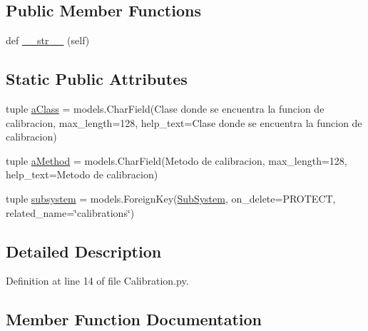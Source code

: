 \subsection*{Public Member Functions}
\begin{DoxyCompactItemize}
\item 
def \hyperlink{class_ground_segment_1_1models_1_1_calibration_1_1_calibration_a2f3b6dc4e9e5e2987a6b9c27184d9d6c}{\+\_\+\+\_\+str\+\_\+\+\_\+} (self)
\end{DoxyCompactItemize}
\subsection*{Static Public Attributes}
\begin{DoxyCompactItemize}
\item 
tuple \hyperlink{class_ground_segment_1_1models_1_1_calibration_1_1_calibration_aeb33dd930555ce324688e2cd8979a7b5}{a\+Class} = models.\+Char\+Field(\textquotesingle{}Clase donde se encuentra la funcion de calibracion\textquotesingle{}, max\+\_\+length=128, help\+\_\+text=\textquotesingle{}Clase donde se encuentra la funcion de calibracion\textquotesingle{})
\item 
tuple \hyperlink{class_ground_segment_1_1models_1_1_calibration_1_1_calibration_a21907a5967e76dc6d5a01ab955ac2578}{a\+Method} = models.\+Char\+Field(\textquotesingle{}Metodo de calibracion\textquotesingle{}, max\+\_\+length=128, help\+\_\+text=\textquotesingle{}Metodo de calibracion\textquotesingle{})
\item 
tuple \hyperlink{class_ground_segment_1_1models_1_1_calibration_1_1_calibration_a918e0918ca8a76ecd5ed1adb9efbc043}{subsystem} = models.\+Foreign\+Key(\hyperlink{class_ground_segment_1_1models_1_1_sub_system_1_1_sub_system}{Sub\+System}, on\+\_\+delete=P\+R\+O\+T\+E\+C\+T, related\+\_\+name=\char`\"{}calibrations\char`\"{})
\end{DoxyCompactItemize}


\subsection{Detailed Description}


Definition at line 14 of file Calibration.\+py.



\subsection{Member Function Documentation}
\hypertarget{class_ground_segment_1_1models_1_1_calibration_1_1_calibration_a2f3b6dc4e9e5e2987a6b9c27184d9d6c}{}
